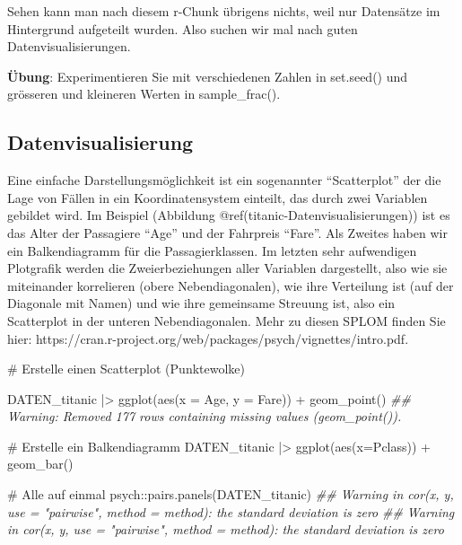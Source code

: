 \documentclass[
  10pt,
  letterpaper,
  a4paper, twoside]{scrreprt}
\newenvironment{Shaded}{\begin{snugshade}}{\end{snugshade}}
\newcommand{\AttributeTok}[1]{\textcolor[rgb]{0.40,0.45,0.13}{#1}}
\newcommand{\CommentTok}[1]{\textcolor[rgb]{0.37,0.37,0.37}{#1}}
\newcommand{\DocumentationTok}[1]{\textcolor[rgb]{0.37,0.37,0.37}{\textit{#1}}}
\newcommand{\FunctionTok}[1]{\textcolor[rgb]{0.28,0.35,0.67}{#1}}
\newcommand{\NormalTok}[1]{\textcolor[rgb]{0.00,0.23,0.31}{#1}}
\newcommand{\SpecialCharTok}[1]{\textcolor[rgb]{0.37,0.37,0.37}{#1}}
\begin{document}
Sehen kann man nach diesem r-Chunk übrigens nichts, weil nur Datensätze
im Hintergrund aufgeteilt wurden. Also suchen wir mal nach guten
Datenvisualisierungen.

\textbf{Übung}: Experimentieren Sie mit verschiedenen Zahlen in
set.seed() und grösseren und kleineren Werten in sample\_frac().

\subsection*{Datenvisualisierung}\label{datenvisualisierung-1}

Eine einfache Darstellungsmöglichkeit ist ein sogenannter
\enquote{Scatterplot} der die Lage von Fällen in ein Koordinatensystem
einteilt, das durch zwei Variablen gebildet wird. Im Beispiel (Abbildung
@ref(titanic-Datenvisualisierungen))
ist es das Alter der Passagiere \enquote{Age} und der Fahrpreis
\enquote{Fare}. Als Zweites haben wir ein Balkendiagramm für die
Passagierklassen. Im letzten sehr aufwendigen Plotgrafik werden die
Zweierbeziehungen aller Variablen dargestellt, also wie sie miteinander
korrelieren (obere Nebendiagonalen), wie ihre Verteilung ist (auf der
Diagonale mit Namen) und wie ihre gemeinsame Streuung ist, also ein
Scatterplot in der unteren Nebendiagonalen. Mehr zu diesen SPLOM finden
Sie hier:
https://cran.r-project.org/web/packages/psych/vignettes/intro.pdf.

\begin{Shaded}
\begin{Highlighting}[]
\CommentTok{\# Erstelle einen Scatterplot (Punktewolke)}

\NormalTok{DATEN\_titanic }\SpecialCharTok{|\textgreater{}} 
  \FunctionTok{ggplot}\NormalTok{(}\FunctionTok{aes}\NormalTok{(}\AttributeTok{x =}\NormalTok{ Age, }\AttributeTok{y =}\NormalTok{ Fare)) }\SpecialCharTok{+} 
  \FunctionTok{geom\_point}\NormalTok{() }
\DocumentationTok{\#\# Warning: Removed 177 rows containing missing values (\textasciigrave{}geom\_point()\textasciigrave{}).}

\CommentTok{\# Erstelle ein Balkendiagramm}
\NormalTok{DATEN\_titanic }\SpecialCharTok{|\textgreater{}} 
  \FunctionTok{ggplot}\NormalTok{(}\FunctionTok{aes}\NormalTok{(}\AttributeTok{x=}\NormalTok{Pclass)) }\SpecialCharTok{+}
  \FunctionTok{geom\_bar}\NormalTok{()}

\CommentTok{\# Alle auf einmal}
\NormalTok{psych}\SpecialCharTok{::}\FunctionTok{pairs.panels}\NormalTok{(DATEN\_titanic) }
\DocumentationTok{\#\# Warning in cor(x, y, use = "pairwise", method = method): the standard deviation is zero}
\DocumentationTok{\#\# Warning in cor(x, y, use = "pairwise", method = method): the standard deviation is zero}
\end{Highlighting}
\end{Shaded}
\end{document}
